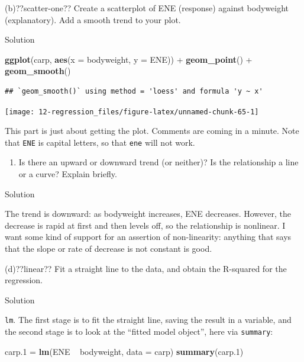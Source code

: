 \documentclass[]{tufte-book}
\newenvironment{Shaded}{}{}
\newcommand{\DataTypeTok}[1]{\textcolor[rgb]{0.56,0.13,0.00}{#1}}
\newcommand{\FloatTok}[1]{\textcolor[rgb]{0.25,0.63,0.44}{#1}}
\newcommand{\KeywordTok}[1]{\textcolor[rgb]{0.00,0.44,0.13}{\textbf{#1}}}
\newcommand{\NormalTok}[1]{#1}
\newcommand{\OperatorTok}[1]{\textcolor[rgb]{0.40,0.40,0.40}{#1}}
\newcommand{\StringTok}[1]{\textcolor[rgb]{0.25,0.44,0.63}{#1}}
\providecommand{\tightlist}{%
  \setlength{\itemsep}{0pt}\setlength{\parskip}{0pt}}
\theoremstyle{definition}
\theoremstyle{definition}
\theoremstyle{definition}
\theoremstyle{remark}
\begin{document}
(b)??scatter-one?? Create a scatterplot of ENE (response) against
bodyweight (explanatory). Add a smooth trend to your plot.

Solution

\begin{Shaded}
\begin{Highlighting}[]
\KeywordTok{ggplot}\NormalTok{(carp, }\KeywordTok{aes}\NormalTok{(}\DataTypeTok{x =}\NormalTok{ bodyweight, }\DataTypeTok{y =}\NormalTok{ ENE)) }\OperatorTok{+}\StringTok{ }\KeywordTok{geom_point}\NormalTok{() }\OperatorTok{+}\StringTok{ }
\StringTok{    }\KeywordTok{geom_smooth}\NormalTok{()}
\end{Highlighting}
\end{Shaded}

\begin{verbatim}
## `geom_smooth()` using method = 'loess' and formula 'y ~ x'
\end{verbatim}

\texttt{[image: 12-regression\_files/figure-latex/unnamed-chunk-65-1]}

This part is just about getting the plot. Comments are coming in a
minute. Note that \texttt{ENE} is capital letters, so that \texttt{ene}
will not work.

\begin{enumerate}
\def\labelenumi{(\alph{enumi})}
\setcounter{enumi}{2}
\tightlist
\item
  Is there an upward or downward trend (or neither)? Is the relationship
  a line or a curve? Explain briefly.
\end{enumerate}

Solution

The trend is downward: as bodyweight increases, ENE decreases. However,
the decrease is rapid at first and then levels off, so the relationship
is nonlinear. I want some kind of support for an assertion of
non-linearity: anything that says that the slope or rate of decrease is
not constant is good.

(d)??linear?? Fit a straight line to the data, and obtain the R-squared
for the regression.

Solution

\texttt{lm}. The first stage is to fit the straight line, saving the
result in a variable, and the second stage is to look at the ``fitted
model object'', here via \texttt{summary}:

\begin{Shaded}
\begin{Highlighting}[]
\NormalTok{carp}\FloatTok{.1}\NormalTok{ =}\StringTok{ }\KeywordTok{lm}\NormalTok{(ENE }\OperatorTok{~}\StringTok{ }\NormalTok{bodyweight, }\DataTypeTok{data =}\NormalTok{ carp)}
\KeywordTok{summary}\NormalTok{(carp}\FloatTok{.1}\NormalTok{)}
\end{Highlighting}
\end{Shaded}
\end{document}
